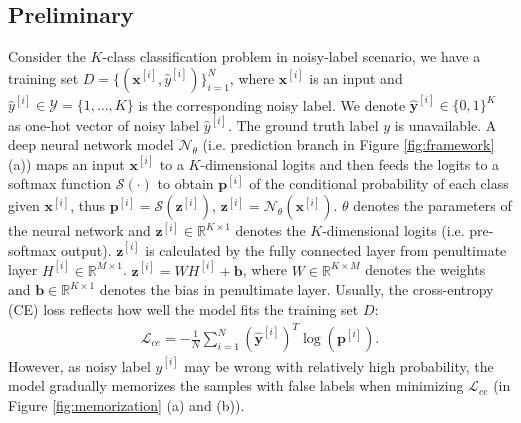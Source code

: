 \documentclass{article}
\begin{document}
\vspace{-1em}
\subsection{Preliminary}
\label{subsec:pre}
Consider the $K$-class classification problem in noisy-label scenario, we have a training set $D=\{(\bm{x}^{[i]},\hat{y}^{[i]})\}^{N}_{i=1}$, where $\bm{x}^{[i]}$ is an input and $\hat{y}^{[i]} \in \mathcal{Y} = \{1,\dots,K\}$ is the corresponding noisy label. We denote $\bm{\hat{y}}^{[i]}\in \{0,1\}^{K}$ as one-hot vector of noisy label $\hat{y}^{[i]}$. The ground truth label $y$ is unavailable. A deep neural network model $\mathcal{N}_{\theta}$ (i.e. prediction branch in Figure \ref{fig:framework} (a)) maps an input $\bm{x}^{[i]}$ to a $K$-dimensional logits and then feeds the logits to a softmax function $\mathcal{S}(\cdot)$ to obtain $\bm{p}^{[i]}$ of the conditional probability of each class given $\bm{x}^{[i]}$, thus $\bm{p}^{[i]}=\mathcal{S}(\bm{z}^{[i]})$, $\bm{z}^{[i]}= \mathcal{N}_{\theta}(\bm{x}^{[i]})$.
$\theta$ denotes the parameters of the neural network and $\bm{z}^{[i]} \in \mathbb{R}^{K \times 1}$ denotes the $K$-dimensional logits (i.e. pre-softmax output). $\bm{z}^{[i]}$ is calculated by the fully connected layer from penultimate layer $H^{[i]} \in \mathbb{R}^{M\times 1}$. $\bm{z}^{[i]} = WH^{[i]}+\bm{b}$, where $W \in \mathbb{R}^{K\times M}$ denotes the weights and $\bm{b} \in \mathbb{R}^{K\times 1}$ denotes the bias in penultimate layer. Usually, the cross-entropy (CE) loss reflects how well the model fits the training set $D$:
\begin{align}
	\label{eq:ce}
	\mathcal{L}_{ce}=-\frac{1}{N}\sum_{i=1}^{N}(\bm{\hat{y}}^{[i]})^{T}\log(\bm{p}^{[i]}).
\end{align}
However, as noisy label $\hat{y}^{[i]}$ may be wrong with relatively high probability, the model gradually memorizes the samples with false labels when minimizing $\mathcal{L}_{ce}$ (in Figure \ref{fig:memorization} (a) and (b)).
\end{document}
